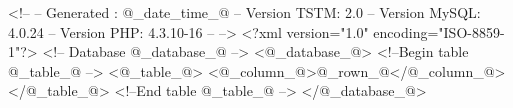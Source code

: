<!--
-- Generated : @_date_time_@
-- Version TSTM: 2.0
-- Version MySQL: 4.0.24
-- Version PHP: 4.3.10-16
--
-->
<?xml version="1.0" encoding="ISO-8859-1"?>
<!-- Database @_database_@ -->
<@_database_@>
<!--Begin table @_table_@ -->
        <@_table_@>
                <@_column_@>@_rown_@</@_column_@>
        </@_table_@>
<!--End table @_table_@ -->
</@_database_@>

